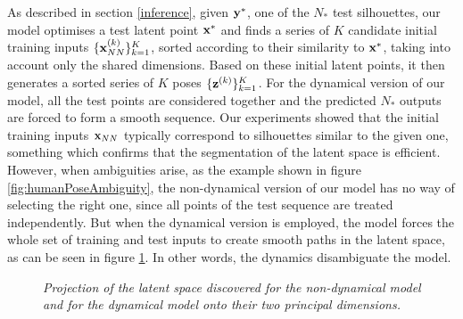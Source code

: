 As described in section \ref{inference}, given $\mathbf{y}^*$, one of the $N_*$ test silhouettes, our model optimises a test latent point $\mathbf{x}^*$ and finds
 a series of $K$ candidate initial training inputs $ \{ \mathbf{x}_{NN}^{(k)} \}_{k=1}^K$, sorted according to their similarity to $\mathbf{x}^*$, taking into account only the shared dimensions. 
 Based on these initial latent points, it then generates a sorted series of $K$ poses $\{ \mathbf{z}^{(k)} \}_{k=1}^K$. For the dynamical version of our model,
all the test points are considered together and the predicted $N_*$ outputs are forced to form a smooth sequence.
 Our experiments showed that the initial training inputs $\mathbf{x}_{NN}$ typically correspond to silhouettes similar to the given one, something which
 confirms that the segmentation of the latent space is efficient. However, when ambiguities arise, as the example
 shown in figure \ref{fig:humanPoseAmbiguity}, the non-dynamical version of our model has no way of selecting the right one, since all points
 of the test sequence are treated independently. But when the dynamical version is employed, the model forces the whole set of training and test inputs to create smooth paths in the latent space, as can be seen in figure \ref{fig:humanPoseLatentSpaces}. In other words,
 the dynamics disambiguate the model.  

\begin{figure}[ht]
\begin{center}
 \hspace{-3pt}
\end{center}
\vspace{-9pt}
\caption{\small{ \it Projection of the latent space discovered for the non-dynamical model 
and for the dynamical model  onto their two principal dimensions.
}
}
\label{fig:humanPoseLatentSpaces}
\vspace{-3pt}
\end{figure}


